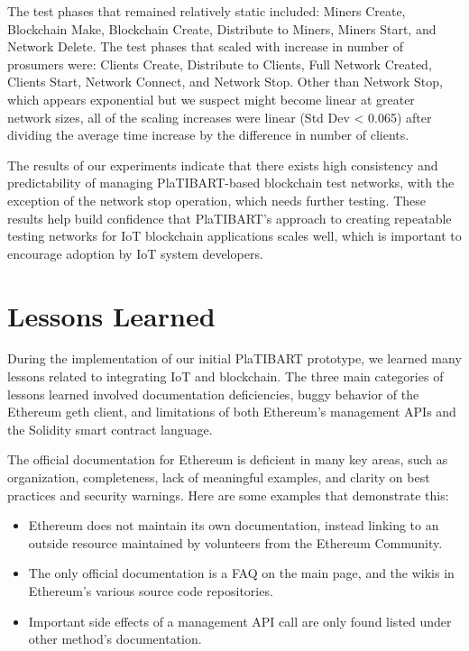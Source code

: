 The test phases that remained relatively static included: Miners Create, Blockchain Make, Blockchain Create, Distribute to Miners, Miners Start, and Network Delete. The test phases that scaled with increase in number of prosumers were: Clients Create, Distribute to Clients, Full Network Created, Clients Start, Network Connect, and Network Stop. Other than Network Stop, which appears exponential but we suspect might become linear at greater network sizes, all of the scaling increases were linear (Std Dev < 0.065) after dividing the average time increase by the difference in number of clients. 

The results of our experiments indicate that there exists high consistency and predictability of managing PlaTIBART-based blockchain test networks, with the exception of the network stop operation, which needs further testing. These results help build confidence that PlaTIBART's approach to creating repeatable testing networks for IoT blockchain applications scales well, which is important to encourage adoption by IoT system developers. 


\section{Lessons Learned}
\label{lessonslearned}

During the implementation of our initial PlaTIBART prototype, we learned many lessons related to integrating IoT and blockchain. The three main categories of lessons learned involved documentation deficiencies, buggy behavior of the Ethereum geth client, and limitations of both Ethereum's management APIs and the Solidity smart contract language.

The official documentation for Ethereum is deficient in many key areas, such as organization, completeness, lack of meaningful examples, and clarity on best practices and security warnings. Here are some examples that demonstrate this:

\begin{itemize}
	\item Ethereum does not maintain its own documentation, instead linking to an outside resource maintained by volunteers from the Ethereum Community.
	\item The only official documentation is a FAQ on the main page, and the wikis in Ethereum's various source code repositories. 
	\item Important side effects of a management API call are only found listed under other method's documentation.
\end{itemize}

